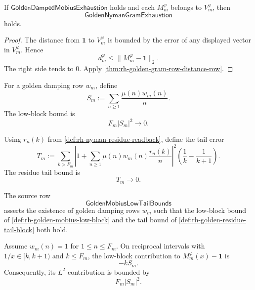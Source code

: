 \begin{theorem}
\label{thm:rh-golden-damped-mobius-exhaustion-gives-golden-nyman}
If $\mathsf{GoldenDampedMobiusExhaustion}$ holds and each
$M_m^{\varphi}$ belongs to $V_m^{\varphi}$, then
$$
\mathsf{GoldenNymanGramExhaustion}
$$
holds.
\end{theorem}

\begin{proof}
The distance from $\mathbf 1$ to $V_m^{\varphi}$ is bounded by the error
of any displayed vector in $V_m^{\varphi}$.  Hence
$$
d_m^{\varphi}
\le
\|M_m^{\varphi}-\mathbf 1\|_2.
$$
The right side tends to $0$.  Apply
\autoref{thm:rh-golden-gram-row-distance-row}.
\end{proof}

\begin{definition}
\label{def:rh-golden-mobius-low-block}
For a golden damping row $w_m$, define
$$
S_m
:=
\sum_{n\ge1}\frac{\mu(n)w_m(n)}{n}.
$$
The low-block bound is
$$
F_m|S_m|^2\to0.
$$
\end{definition}

\begin{definition}
\label{def:rh-golden-residue-tail-block}
Using $r_n(k)$ from
\autoref{def:rh-nyman-residue-readback}, define the tail error
$$
T_m
:=
\sum_{k>F_m}
\left|
1+
\sum_{n\ge1}\mu(n)w_m(n)\frac{r_n(k)}{n}
\right|^2
\left(
\frac{1}{k}-\frac{1}{k+1}
\right).
$$
The residue tail bound is
$$
T_m\to0.
$$
\end{definition}

\begin{definition}
\label{def:rh-golden-mobius-low-tail-bounds}
The source row
$$
\mathsf{GoldenMobiusLowTailBounds}
$$
asserts the existence of golden damping rows $w_m$ such that the
low-block bound of \autoref{def:rh-golden-mobius-low-block} and the
tail bound of \autoref{def:rh-golden-residue-tail-block} both hold.
\end{definition}

\begin{lemma}
\label{lem:rh-low-block-bound-controls-low-intervals}
Assume $w_m(n)=1$ for $1\le n\le F_m$.  On reciprocal intervals with
$1/x\in[k,k+1)$ and $k\le F_m$, the low-block contribution to
$M_m^{\varphi}(x)-\mathbf 1$ is
$$
-
kS_m.
$$
Consequently, its $L^2$ contribution is bounded by
$$
F_m|S_m|^2.
$$
\end{lemma}

